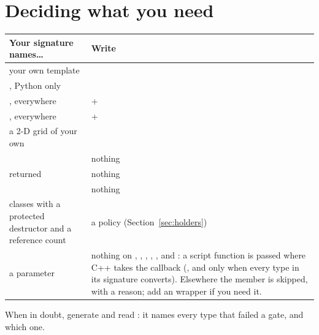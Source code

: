 \section{Deciding what you need}

\begin{center}
\small
\begin{tabular}{@{}L{6.4cm}L{7.0cm}@{}}
\toprule
\textbf{Your signature names\ldots} & \textbf{Write} \\
\midrule
your own  template &  \\
, Python only &  \\
, everywhere &
   +  \\
, everywhere &
   +  \\
a 2-D grid of your own &  \\
 & nothing \\
 returned & nothing \\
 & nothing \\
classes with a protected destructor and a reference count &
  a  policy (Section~\ref{sec:holders}) \\
a  parameter & nothing on , ,
  , , ,  and : a script function is passed where
  C++ takes the callback (,  and  only when every
  type in its signature converts). Elsewhere the member is skipped, with a
  reason; add an  wrapper if you need it. \\
\bottomrule
\end{tabular}
\end{center}

When in doubt, generate and read : it names every type that
failed a gate, and which one.
